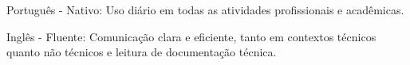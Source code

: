 
\begin{cventries}
  \cventry
  {}
  {
    \begin{cvitems} %
      \item {Português - Nativo: Uso diário em todas as atividades profissionais e acadêmicas.}
      \item {Inglês - Fluente: Comunicação clara e eficiente, tanto em contextos técnicos quanto não técnicos e leitura de documentação técnica.}
    \end{cvitems}
  }
  {} {} {}
\end{cventries}